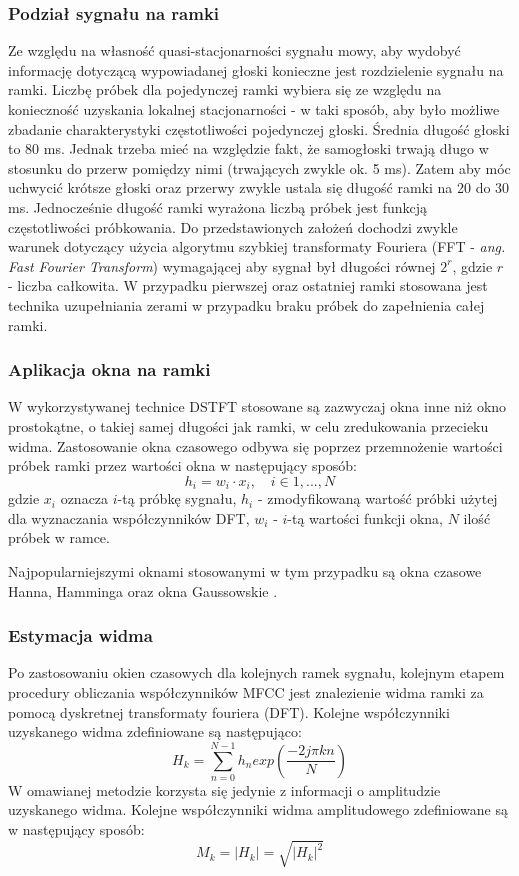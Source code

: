 \subsubsection{Podział sygnału na ramki}
Ze względu na własność quasi-stacjonarności sygnału mowy, aby wydobyć informację dotyczącą wypowiadanej głoski konieczne jest rozdzielenie sygnału na ramki.
Liczbę próbek dla pojedynczej ramki wybiera się ze względu na konieczność uzyskania lokalnej stacjonarności - w taki sposób, aby było możliwe zbadanie charakterystyki częstotliwości pojedynczej głoski. Średnia długość głoski to 80 ms. Jednak trzeba mieć na względzie fakt, że samogłoski trwają długo w stosunku do przerw pomiędzy nimi (trwających zwykle ok. 5 ms). Zatem aby móc uchwycić krótsze głoski oraz przerwy zwykle ustala się długość ramki na 20 do 30 ms. Jednocześnie długość ramki wyrażona liczbą próbek jest funkcją częstotliwości próbkowania. Do przedstawionych założeń dochodzi zwykle warunek dotyczący użycia algorytmu szybkiej transformaty Fouriera (FFT - \textit{ang. Fast Fourier Transform}) wymagającej aby sygnał był długości równej $2^r$, gdzie $r$ - liczba całkowita. W przypadku pierwszej oraz ostatniej ramki stosowana jest technika uzupełniania zerami w przypadku braku próbek do zapełnienia całej ramki.

\subsubsection{Aplikacja okna na ramki}
W wykorzystywanej technice DSTFT stosowane są zazwyczaj okna inne niż okno prostokątne, o takiej samej długości jak ramki, w celu zredukowania przecieku widma. Zastosowanie okna czasowego odbywa się poprzez przemnożenie wartości próbek ramki przez wartości okna w następujący sposób:
\begin{equation}
  h_i = w_i \cdot x_i, \quad i \in {1,...,N}
\end{equation}
gdzie $x_i$ oznacza $i$-tą próbkę sygnału, $h_i$ - zmodyfikowaną wartość próbki użytej dla wyznaczania współczynników DFT, $w_i$ - $i$-tą wartości funkcji okna, $N$ ilość próbek w ramce. 

Najpopularniejszymi oknami stosowanymi w tym przypadku są okna czasowe Hanna, Hamminga oraz okna Gaussowskie \cite{fosr}.

\subsubsection{Estymacja widma}
\label{stft}
Po zastosowaniu okien czasowych dla kolejnych ramek sygnału, kolejnym etapem procedury obliczania współczynników MFCC jest znalezienie widma ramki za pomocą dyskretnej transformaty fouriera (DFT). Kolejne współczynniki uzyskanego widma zdefiniowane są następująco:
\begin{equation}
  H_k = \sum^{N-1}_{n=0} h_n exp(\frac{-2j\pi kn}{N} )
\end{equation}
W omawianej metodzie korzysta się jedynie z informacji o amplitudzie uzyskanego widma. Kolejne współczynniki widma amplitudowego zdefiniowane są w następujący sposób:
\begin{equation}
  M_k = |H_k| = \sqrt{|H_k|^2}
\end{equation}

